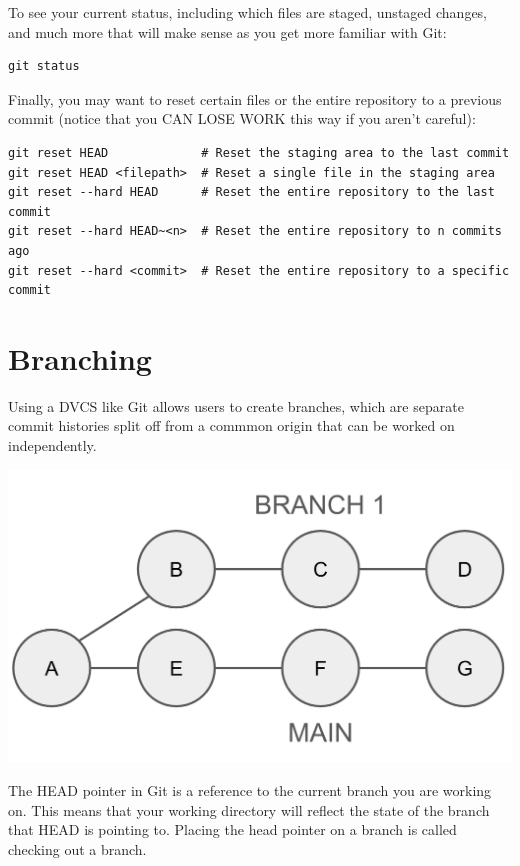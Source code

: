 \documentclass[fleqn]{article}
\begin{document}
To see your current status, including which files are staged, unstaged changes,
and much more that will make sense as you get more familiar with Git:

\begin{lstlisting}
git status
\end{lstlisting}

Finally, you may want to reset certain files or the entire repository to a
previous commit (notice that you CAN LOSE WORK this way if you aren't careful):

\begin{lstlisting}
git reset HEAD             # Reset the staging area to the last commit
git reset HEAD <filepath>  # Reset a single file in the staging area
git reset --hard HEAD      # Reset the entire repository to the last commit
git reset --hard HEAD~<n>  # Reset the entire repository to n commits ago
git reset --hard <commit>  # Reset the entire repository to a specific commit
\end{lstlisting}

\pagebreak

\section*{Branching}

Using a DVCS like Git allows users to create branches, which are separate
commit histories split off from a commmon origin that can be worked on
independently. 

\begin{center}
    \includegraphics[scale=0.3]{branch.png}
\end{center}

The HEAD pointer in Git is a reference to the current branch you are working on.
This means that your working directory will reflect the state of the branch
that HEAD is pointing to. Placing the head pointer on a branch is called
checking out a branch.
\end{document}
